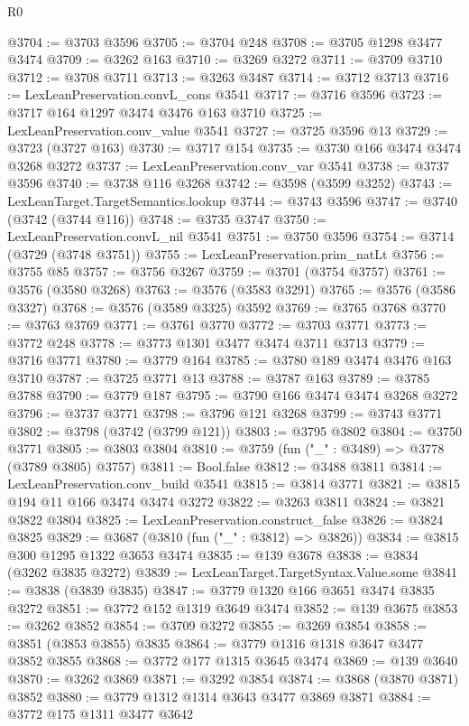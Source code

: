 \begin{lexlean}{R0}
\begin{coremodule}
@3704 := @3703 @3596
@3705 := @3704 @248
@3708 := @3705 @1298 @3477 @3474
@3709 := @3262 @163
@3710 := @3269 @3272
@3711 := @3709 @3710
@3712 := @3708 @3711
@3713 := @3263 @3487
@3714 := @3712 @3713
@3716 := LexLeanPreservation.convL_cons @3541
@3717 := @3716 @3596
@3723 := @3717 @164 @1297 @3474 @3476 @163 @3710
@3725 := LexLeanPreservation.conv_value @3541
@3727 := @3725 @3596 @13
@3729 := @3723 (@3727 @163)
@3730 := @3717 @154
@3735 := @3730 @166 @3474 @3474 @3268 @3272
@3737 := LexLeanPreservation.conv_var @3541
@3738 := @3737 @3596
@3740 := @3738 @116 @3268
@3742 := @3598 (@3599 @3252)
@3743 := LexLeanTarget.TargetSemantics.lookup
@3744 := @3743 @3596
@3747 := @3740 (@3742 (@3744 @116))
@3748 := @3735 @3747
@3750 := LexLeanPreservation.convL_nil @3541
@3751 := @3750 @3596
@3754 := @3714 (@3729 (@3748 @3751))
@3755 := LexLeanPreservation.prim_natLt
@3756 := @3755 @85
@3757 := @3756 @3267
@3759 := @3701 (@3754 @3757)
@3761 := @3576 (@3580 @3268)
@3763 := @3576 (@3583 @3291)
@3765 := @3576 (@3586 @3327)
@3768 := @3576 (@3589 @3325) @3592
@3769 := @3765 @3768
@3770 := @3763 @3769
@3771 := @3761 @3770
@3772 := @3703 @3771
@3773 := @3772 @248
@3778 := @3773 @1301 @3477 @3474 @3711 @3713
@3779 := @3716 @3771
@3780 := @3779 @164
@3785 := @3780 @189 @3474 @3476 @163 @3710
@3787 := @3725 @3771 @13
@3788 := @3787 @163
@3789 := @3785 @3788
@3790 := @3779 @187
@3795 := @3790 @166 @3474 @3474 @3268 @3272
@3796 := @3737 @3771
@3798 := @3796 @121 @3268
@3799 := @3743 @3771
@3802 := @3798 (@3742 (@3799 @121))
@3803 := @3795 @3802
@3804 := @3750 @3771
@3805 := @3803 @3804
@3810 := @3759 (fun ("_" : @3489) => @3778 (@3789 @3805) @3757)
@3811 := Bool.false
@3812 := @3488 @3811
@3814 := LexLeanPreservation.conv_build @3541
@3815 := @3814 @3771
@3821 := @3815 @194 @11 @166 @3474 @3474 @3272
@3822 := @3263 @3811
@3824 := @3821 @3822 @3804
@3825 := LexLeanPreservation.construct_false
@3826 := @3824 @3825
@3829 := @3687 (@3810 (fun ("_" : @3812) => @3826))
@3834 := @3815 @300 @1295 @1322 @3653 @3474
@3835 := @139 @3678
@3838 := @3834 (@3262 @3835 @3272)
@3839 := LexLeanTarget.TargetSyntax.Value.some
@3841 := @3838 (@3839 @3835)
@3847 := @3779 @1320 @166 @3651 @3474 @3835 @3272
@3851 := @3772 @152 @1319 @3649 @3474
@3852 := @139 @3675
@3853 := @3262 @3852
@3854 := @3709 @3272
@3855 := @3269 @3854
@3858 := @3851 (@3853 @3855) @3835
@3864 := @3779 @1316 @1318 @3647 @3477 @3852 @3855
@3868 := @3772 @177 @1315 @3645 @3474
@3869 := @139 @3640
@3870 := @3262 @3869
@3871 := @3292 @3854
@3874 := @3868 (@3870 @3871) @3852
@3880 := @3779 @1312 @1314 @3643 @3477 @3869 @3871
@3884 := @3772 @175 @1311 @3477 @3642

\end{coremodule}
\end{lexlean}
